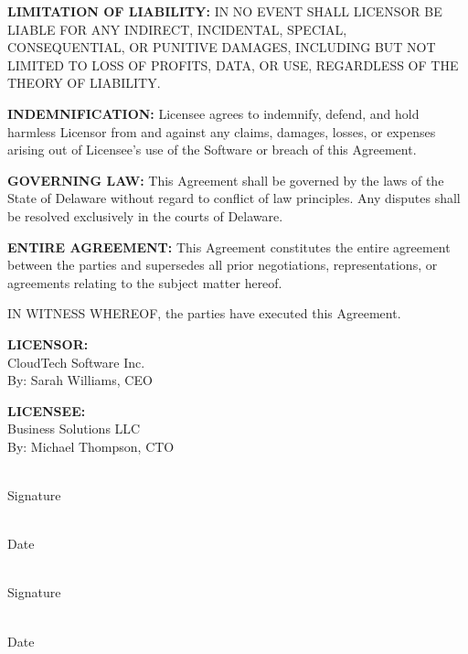 \documentclass[12pt,letterpaper]{article}
\begin{document}
\vspace{0.3cm}
\noindent \textbf{LIMITATION OF LIABILITY:} IN NO EVENT SHALL LICENSOR BE LIABLE FOR ANY INDIRECT, INCIDENTAL, SPECIAL, CONSEQUENTIAL, OR PUNITIVE DAMAGES, INCLUDING BUT NOT LIMITED TO LOSS OF PROFITS, DATA, OR USE, REGARDLESS OF THE THEORY OF LIABILITY.

\vspace{0.3cm}
\noindent \textbf{INDEMNIFICATION:} Licensee agrees to indemnify, defend, and hold harmless Licensor from and against any claims, damages, losses, or expenses arising out of Licensee's use of the Software or breach of this Agreement.

\vspace{0.3cm}
\noindent \textbf{GOVERNING LAW:} This Agreement shall be governed by the laws of the State of Delaware without regard to conflict of law principles. Any disputes shall be resolved exclusively in the courts of Delaware.

\vspace{0.3cm}
\noindent \textbf{ENTIRE AGREEMENT:} This Agreement constitutes the entire agreement between the parties and supersedes all prior negotiations, representations, or agreements relating to the subject matter hereof.

\vspace{0.5cm}
\noindent IN WITNESS WHEREOF, the parties have executed this Agreement.

\vspace{1cm}
\noindent \textbf{LICENSOR:}\\
CloudTech Software Inc.\\
By: Sarah Williams, CEO

\vspace{1cm}
\noindent \textbf{LICENSEE:}\\
Business Solutions LLC\\
By: Michael Thompson, CTO

\vspace{1cm}
\noindent \underline{\hspace{3in}}\\
Signature

\vspace{0.3cm}
\noindent \underline{\hspace{3in}}\\
Date

\vspace{1cm}
\noindent \underline{\hspace{3in}}\\
Signature

\vspace{0.3cm}
\noindent \underline{\hspace{3in}}\\
Date
\end{document}
